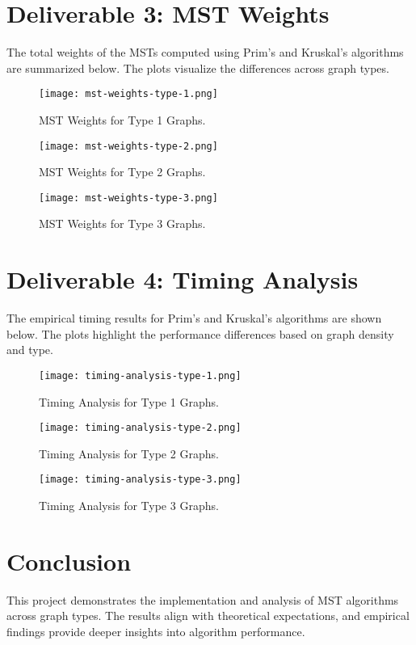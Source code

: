 \documentclass{article}
\begin{document}
\section*{Deliverable 3: MST Weights}
The total weights of the MSTs computed using Prim's and Kruskal's algorithms are summarized below. The plots visualize the differences across graph types.

\begin{figure}[h!]
\centering
\texttt{[image: mst-weights-type-1.png]}
\caption{MST Weights for Type 1 Graphs.}
\end{figure}

\begin{figure}[h!]
\centering
\texttt{[image: mst-weights-type-2.png]}
\caption{MST Weights for Type 2 Graphs.}
\end{figure}

\begin{figure}[h!]
\centering
\texttt{[image: mst-weights-type-3.png]}
\caption{MST Weights for Type 3 Graphs.}
\end{figure}

\section*{Deliverable 4: Timing Analysis}
The empirical timing results for Prim's and Kruskal's algorithms are shown below. The plots highlight the performance differences based on graph density and type.

\begin{figure}[h!]
\centering
\texttt{[image: timing-analysis-type-1.png]}
\caption{Timing Analysis for Type 1 Graphs.}
\end{figure}

\begin{figure}[h!]
\centering
\texttt{[image: timing-analysis-type-2.png]}
\caption{Timing Analysis for Type 2 Graphs.}
\end{figure}

\begin{figure}[h!]
\centering
\texttt{[image: timing-analysis-type-3.png]}
\caption{Timing Analysis for Type 3 Graphs.}
\end{figure}

\section*{Conclusion}
This project demonstrates the implementation and analysis of MST algorithms across graph types. The results align with theoretical expectations, and empirical findings provide deeper insights into algorithm performance.
\end{document}
